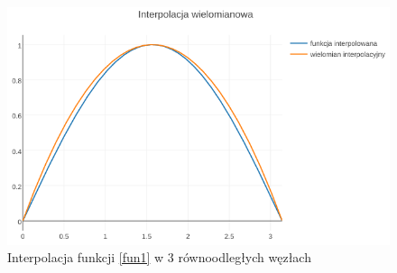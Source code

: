 \documentclass{article}
\begin{document}
\begin{figure}[ht]
	\begin{center}
		\includegraphics[width=13cm]{lagrange_sin}
	\end{center}
	\caption{Interpolacja funkcji \eqref{fun1} w 3 równoodległych węzłach}
	\label{fig:rysunek1}
\end{figure}
\end{document}
